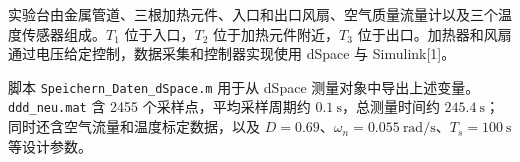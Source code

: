 实验台由金属管道、三根加热元件、入口和出口风扇、空气质量流量计以及三个温度传感器组成。$T_1$ 位于入口，$T_2$ 位于加热元件附近，$T_3$ 位于出口。加热器和风扇通过电压给定控制，数据采集和控制器实现使用 dSpace 与 Simulink[1]。

脚本 \texttt{Speichern\_Daten\_dSpace.m} 用于从 dSpace 测量对象中导出上述变量。\texttt{ddd\_neu.mat} 含 2455 个采样点，平均采样周期约 $\SI{0.1}{\second}$，总测量时间约 $\SI{245.4}{\second}$；同时还含空气流量和温度标定数据，以及 $D = 0.69$、$\omega_n = \SI{0.055}{\radian\per\second}$、$T_s = \SI{100}{\second}$ 等设计参数。
